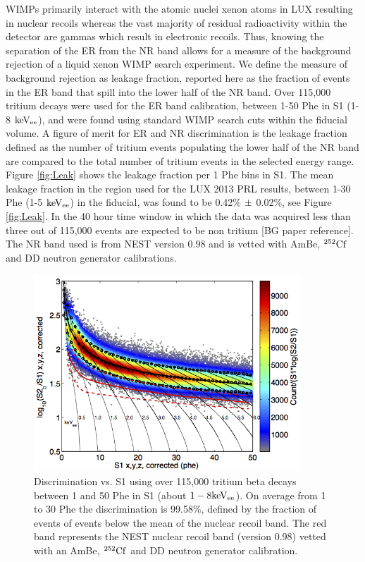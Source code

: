 WIMPs primarily interact with the atomic nuclei xenon atoms in LUX resulting in nuclear recoils whereas the vast majority of residual radioactivity within the detector are gammas which result in electronic recoils. Thus, knowing the separation of the ER from the NR band allows for a measure of the background rejection of a liquid xenon WIMP search experiment. We define the measure of background rejection as leakage fraction, reported here as the fraction of events in the ER band that spill into the lower half of the NR band. Over 115,000 tritium decays were used for the ER band calibration, between 1-50 Phe in S1 (1-8 $\rm keV_{ee}$), and were found using standard WIMP search cuts within the fiducial volume. A figure of merit for ER and NR discrimination is the leakage fraction defined as  the number of tritium events populating the lower half of the NR band are compared to the total number of tritium events in the selected energy range. 
Figure \ref{fig:Leak} shows the leakage fraction per 1 Phe bins in S1. The mean leakage fraction in the region used for the LUX 2013 PRL results, between 1-30 Phe (1-5 $\rm keV_{ee}$) in the fiducial, was found to be 0.42\% $\rm \pm$ 0.02\%, see Figure \ref{fig:Leak}. In the 40 hour time window in which the data was acquired less than three out of 115,000 events are expected to be non tritium [BG paper reference]. The NR band used is from NEST version 0.98 and is vetted with AmBe, $\rm^{252}Cf$ and DD neutron generator calibrations.


\begin{figure}[h!]\centering
\includegraphics[width=100mm]{CH3T_fid_50_2_Dec_Tritium_Approval_Plots.png}
\caption{Discrimination vs. S1 using over 115,000 tritium beta decays between 1 and 50 Phe in S1 (about $\rm1-8 keV_{ee}$). On average from 1 to 30 Phe the discrimination is 99.58\%, defined by the fraction of events of events below the mean of the nuclear recoil band. The red band represents the NEST nuclear recoil band (version 0.98) vetted with an AmBe, $\rm^{252}Cf$ and DD neutron generator calibration.}
\label{fig:Band}
\end{figure}

